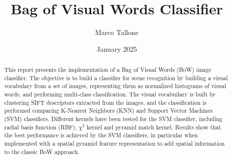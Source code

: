 \documentclass{settings/notex}
\title{
  Bag of Visual Words Classifier\\
  \vspace{0.35cm}
  \fontsize{12pt}{12pt}\selectfont{
    Computer Vision and Pattern Recognition Exam\\
    \vspace{0.25cm}
    University of Trieste (UniTS)
  }
}
\author{Marco Tallone}
\date{January 2025}
\begin{document}
\maketitle

\begin{abstract}
\noindent
This report presents the implementation of a Bag of Visual Words (BoW) image classifier.
The objective is to build a classifier for scene recognition by building a visual vocabulary from a set of images, representing them as normalized histograms of visual words, and performing multi-class classification.
The visual vocabuilary is built by clustering SIFT descriptors extracted from the images, and the classification is performed comparing K-Nearest Neighbors (KNN) and Support Vector Machines (SVM) classifiers.
Different kernels have been tested for the SVM classifier, including radial basis function (RBF), $\chi^2$ kernel and pyramid match kernel.
Results show that the best performance is achieved by the SVM classifiers, in particular when implemented with a spatial pyramid feature representation to add spatial information to the classic BoW approach.
\end{abstract}










% 
% 

\pagebreak
\appendix
\renewcommand{\thesection}{\Alph{section}} %
\renewcommand{\thesubsection}{\thesection\arabic{subsection}} %

\end{document}
